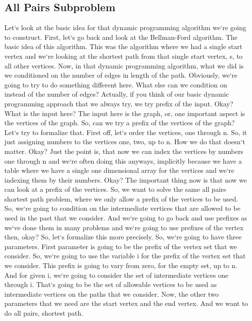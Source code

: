 \subsection{All Pairs  Subproblem}
Let`s look at the basic idea for that dynamic programming algorithm we`re going to construct.
First, let`s go back and look at the Bellman-Ford algorithm.
The basic idea of this algorithm.
This was the algorithm where we had a single start vertex and we`re looking at the shortest path from that single start vertex, s, to all other vertices.
Now, in that dynamic programming algorithm, what we did is we conditioned on the number of edges in length of the path.
Obviously, we`re going to try to do something different here.
What else can we condition on instead of the number of edges? Actually, if you think of our basic dynamic programming approach that we always try, we try prefix of the input.
Okay? What is the input here? The input here is the graph, or, one important aspect is the vertices of the graph.
So, can we try a prefix of the vertices of the graph? Let`s try to formalize that.
First off, let`s order the vertices, one through n.
So, it just assigning numbers to the vertices one, two, up to n.
How we do that doesn`t matter.
Okay? Just the point is, that now we can index the vertices by numbers one through n and we`re often doing this anyways, implicitly because we have a table where we have a single one dimensional array for the vertices and we`re indexing them by their numbers.
Okay? The important thing now is that now we can look at a prefix of the vertices.
So, we want to solve the same all pairs shortest path problem, where we only allow a prefix of the vertices to be used.
So, we`re going to condition on the intermediate vertices that are allowed to be used in the past that we consider.
And we`re going to go back and use prefixes as we`ve done them in many problems and we`re going to use prefixes of the vertex then, okay? So, let`s formalize this more precisely.
So, we`re going to have three parameters.
First parameter is going to be the prefix of the vertex set that we consider.
So, we`re going to use the variable i for the prefix of the vertex set that we consider.
This prefix is going to vary from zero, for the empty set, up to n.
And for given i, we`re going to consider the set of intermediate vertices one through i.
That`s going to be the set of allowable vertices to be used as intermediate vertices on the paths that we consider.
Now, the other two parameters that we need are the start vertex and the end vertex.
And we want to do all pairs, shortest path.
